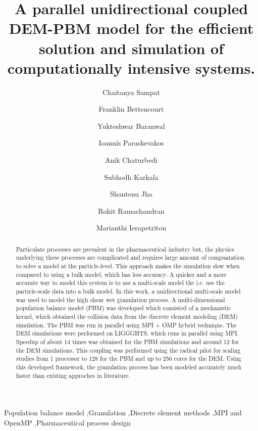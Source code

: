 \documentclass[preprint,11pt,authoryear]{elsarticle}
\begin{document}
\begin{frontmatter}

\title{A parallel unidirectional coupled DEM-PBM model for the efficient solution and simulation of 
computationally  intensive systems.}
\author[add1]{Chaitanya Sampat}
\author[add1]{Franklin Bettencourt}
\author[add1]{Yukteshwar Baranwal}
\author[add2]{Ioannis Paraskevakos}
\author[add1]{Anik Chaturbedi}
\author[add1]{Subhodh Karkala}
\author[add2]{Shantenu Jha}
\author[add1]{Rohit Ramachandran}
\author[add1]{Marianthi Ierapetritou}
\address[add1]{Department of Chemical and Biochemical Engineering, Rutgers, The State University of New
Jersey, Piscataway, NJ, USA-08854}
\address[add2]{Electrical and Computer Engineering, Rutgers, The State University of New Jersey, 
Piscataway, NJ, USA-08854}

\begin{abstract}
Particulate processes are prevalent in the pharmaceutical industry but, the physics underlying 
these processes are complicated and requires large amount of compuatation to solve a model at the
particle-level. This approach makes the simulation slow when compared to using a bulk model, 
which has less accuracy. A quicker and a more accurate way to model this system is to use a multi-scale 
model the i.e. use the particle-scale data into a bulk model. 
In this work, a unidirectional multi-scale model was used to model the high shear wet granulation 
process. A multi-dimensional population balance model (PBM) was developed which 
consisted of a mechanistic kernel, which obtained the collision data from the discrete element 
modeling (DEM) simulation. The PBM was run in parallel using MPI + OMP hybrid technique. The DEM 
simulations were performed on
LIGGGHTS, which runs in parallel using MPI. Speedup of about 14 times was obtained for the PBM 
simulations and around 12 for the DEM simulations. This coupling was performed using the radical 
pilot for scaling studies from 1 processor to 128 for the PBM and up to 256 cores for the DEM. Using 
this developed framework, the granulation process has been modeled accurately 
much faster than existing approches in literature.
\end{abstract}
\begin{keyword}
Population balance model \sep Granulation \sep Discrete element methods  \sep MPI and OpenMP 
\sep Pharmaceutical process design
\end{keyword}
\end{frontmatter}
\linenumbers
\end{document}
